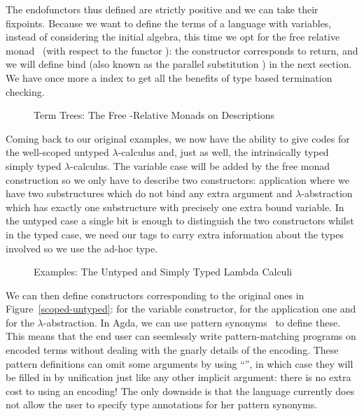 The endofunctors thus defined are strictly positive and we can take their fixpoints.
Because we want to define the terms of a language with variables, instead of
considering the initial algebra, this time we opt for the free relative
monad~\cite{JFR4389} (with respect to the functor ): the 
constructor corresponds to return, and we will define bind (also known as
the parallel substitution ) in the next section. We have once more
a  index to get all the benefits of type based termination checking.

\begin{figure}[h]
\caption{Term Trees: The Free -Relative Monads on Descriptions}
\end{figure}

Coming back to our original examples, we now have the ability to give
codes for the well-scoped untyped $\lambda$-calculus and, just as well,
the intrinsically typed simply typed $\lambda$-calculus.
The variable case will be added by the free monad construction so we
only have to describe two constructors: application where we have two
substructures which do not bind any extra argument and $\lambda$-abstraction
which has exactly one substructure with precisely one extra bound variable.
In the untyped case a single bit is enough to distinguish the two constructors
whilst in the typed case, we need our tags to carry extra information about the
types involved so we use the ad-hoc  type.

\begin{figure}[h]
\begin{minipage}{0.45\textwidth}
\end{minipage}\hspace{2em}
\begin{minipage}{0.45\textwidth}
\end{minipage}
\caption{Examples: The Untyped and Simply Typed Lambda Calculi}
\end{figure}

We can then define constructors corresponding
to the original ones in Figure~\ref{scoped-untyped}: 
for  the variable constructor,  for  the
application one and  for  the $\lambda$-abstraction.
In Agda, we can use pattern synonyms~\cite{Pickering:patsyn} to define these.
This means that the end user can seemlessly write pattern-matching programs on
encoded terms without dealing with the gnarly details of the encoding.
These pattern definitions can omit some arguments by using ``\AS{\_}'',
in which case they will be filled in by unification just like any other
implicit argument: there is no extra cost to using an encoding!
The only downside is that the language currently does not allow the
user to specify type annotations for her pattern synonyms.

